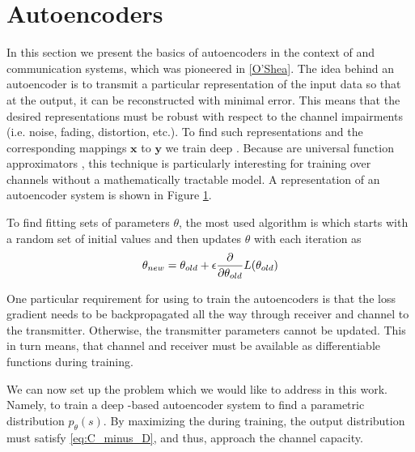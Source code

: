 	
\section{Autoencoders}
In this section we present the basics of autoencoders in the context of  and communication systems, which was pioneered in \ref{O’Shea}. The idea behind an autoencoder is to transmit a particular representation of the input data so that at the output, it can be reconstructed with minimal error. This means that the desired representations must be robust with respect to the channel impairments (i.e. noise, fading, distortion, etc.). To find such representations and the corresponding mappings $\textbf{x}$ to $\textbf{y}$ we train deep . Because  are universal function approximators \cite{HORNIK1989359}, this technique is particularly interesting for training over channels without a mathematically tractable model. A representation of an autoencoder system is shown in Figure \ref{}.

To find fitting sets of parameters \textbf{$\theta$}, the most used algorithm is  which starts with a random set of initial values and then updates \textbf{$\theta$} with each iteration as
\begin{align}
	\theta_{new} = \theta_{old} + \epsilon \pdv{\theta_{old}} L(\theta_{old})
\end{align}

One particular requirement for using  to train the autoencoders is that the loss gradient needs to be backpropagated
all the way through receiver and channel to the transmitter. Otherwise, the transmitter parameters cannot be updated. This in turn means, that channel and receiver must be available as differentiable functions during training.

We can now set up the problem which we would like to address in this work. Namely, to train a deep -based autoencoder system to find a parametric distribution $p_{\theta}(s)$. By maximizing the  during training, the output distribution must satisfy \ref{eq:C_minus_D}, and thus, approach the channel capacity.
